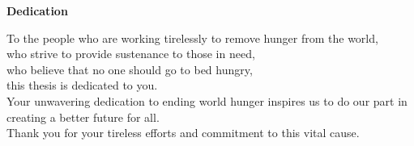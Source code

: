\begin{center}
\Large \textbf{Dedication}\\[1cm]
\normalsize
\begin{center}
To the people who are working tirelessly to remove hunger from the world,\\
who strive to provide sustenance to those in need,\\
who believe that no one should go to bed hungry,\\
this thesis is dedicated to you.\\[0.5cm]
Your unwavering dedication to ending world hunger inspires us to do our part in creating a better future for all.\\[0.5cm]
Thank you for your tireless efforts and commitment to this vital cause.\\[0.5cm]
\end{center}
\end{center}